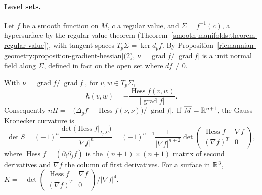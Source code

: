 \paragraph{Level sets.} Let $f$ be a smooth function on $\overline{M}$, $c$ a regular value, and $\Sigma = f^{-1}(c)$, a hypersurface by the regular value theorem
(Theorem~\ref{smooth-manifolds:theorem-regular-value}), with tangent spaces $T_p\Sigma = \ker d_pf$. By Proposition~\ref{riemannian-geometry:proposition-gradient-hessian}(2), $\nu = \operatorname{grad}f/|\operatorname{grad}f|$ is a
unit normal field along $\Sigma$, defined in fact on the open set where $df \neq 0$.

\begin{proposition}\label{riemannian-geometry:proposition-level-set-second-fundamental-form}
With $\nu = \operatorname{grad}f/|\operatorname{grad}f|$, for $v, w \in T_p\Sigma$,
\[
h(v, w) = -\frac{\operatorname{Hess}f(v, w)}{|\operatorname{grad}f|} .
\]
Consequently $n H = -\bigl(\Delta_gf - \operatorname{Hess}f(\nu, \nu)\bigr)/|\operatorname{grad}f|$. If $\overline{M} = \mathbb{R}^{n+1}$, the Gauss--Kronecker curvature is
\[
\det S = (-1)^n\frac{\det\bigl(\operatorname{Hess}f|_{T_p\Sigma}\bigr)}{|\nabla f|^n} = (-1)^{n+1}\frac{1}{|\nabla f|^{n+2}}\det\begin{pmatrix}\operatorname{Hess}f & \nabla f\\ (\nabla f)^T & 0\end{pmatrix},
\]
where $\operatorname{Hess}f = (\partial_i\partial_jf)$ is the $(n+1) \times (n+1)$ matrix of second derivatives and $\nabla f$ the column of first derivatives. For a surface in $\mathbb{R}^3$, $K = -\det\begin{pmatrix}\operatorname{Hess}f & \nabla f\\ (\nabla f)^T & 0\end{pmatrix}/|\nabla f|^4$.
\end{proposition}

